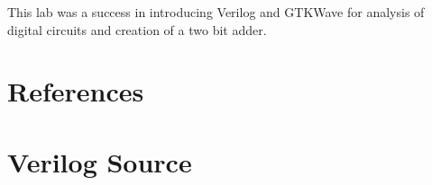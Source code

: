 \documentclass[12pt]{article}
\begin{document}
This lab was a success in introducing Verilog and GTKWave for analysis
of digital circuits and creation of a two bit adder.


\renewcommand*{\refname}{\vspace{-8mm}}
\section{References}



\appendix

\clearpage
\section{Verilog Source}
\label{sec:source}

{\footnotesize

}
\end{document}
